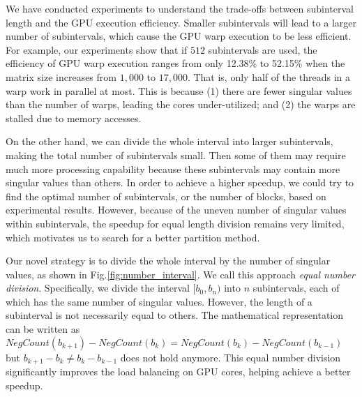 We have conducted experiments to understand the trade-offs between subinterval length and the GPU execution efficiency. 
Smaller subintervals will lead to a larger number of subintervals, which cause the GPU warp execution to be less efficient. 
For example, our experiments show that if $512$ subintervals are used, the efficiency of GPU warp execution ranges from only 12.38\% to 52.15\% when the matrix size increases from $1,000$ to $17,000$.
That is, only half of the threads in a warp work in parallel at most. This is because  (1)
 there are fewer singular values than the number of warps, leading the cores under-utilized; and 
(2) the warps are stalled due to memory accesses.

On the other hand, we can divide the whole interval into larger subintervals, making the total number of subintervals small. 
Then some of them may require much more processing capability
because these subintervals may contain more singular values than others.
In order to achieve a higher speedup, we could try to find the optimal number of subintervals, or the number of blocks, based on experimental results. 
However, because of the uneven number of singular values within subintervals, the speedup for equal length division remains very limited, which motivates us to search for a better partition method.

Our novel strategy is to divide the whole interval by the number of singular values, as shown in Fig.\ref{fig:number_interval}. We call this approach {\it equal number division}. 
Specifically, we divide the interval $[b_0,b_n)$ into $n$ subintervals, each of which has the same number of singular values. 
However, the length of a subinterval is not necessarily equal to others.
The mathematical representation can be written as $NegCount(b_{k+1})-NegCount(b_{k})=NegCount(b_{k})-NegCount(b_{k-1})$ but $b_{k+1}-b_k \ne b_{k}-b_{k-1}$ does not hold anymore.
This equal number division significantly improves the load balancing on GPU cores, helping achieve a better speedup.

%

